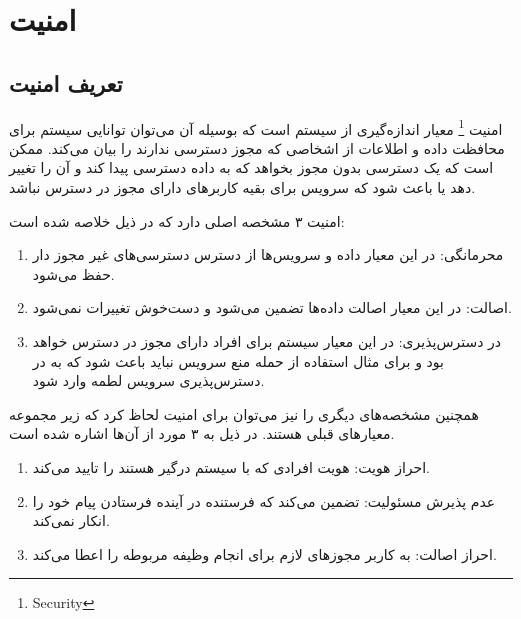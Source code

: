 \chapter{امنیت}
\section{تعریف امنیت}
امنیت \footnote{Security}
معیار اندازه‌گیری از سیستم است که بوسیله آن می‌توان توانایی سیستم برای محافظت داده و اطلاعات از اشخاصی که مجوز دسترسی ندارند را بیان می‌کند.
ممکن است که یک دسترسی بدون مجوز بخواهد که به داده دسترسی پیدا کند و آن را تغییر دهد یا باعث شود که سرویس برای بقیه کاربرهای دارای مجوز در دسترس نباشد.

امنیت ۳ مشخصه اصلی دارد که در ذیل خلاصه شده است:
\begin{enumerate}
\item
محرمانگی: در این معیار داده و سرویس‌ها از دسترس دسترسی‌های غیر مجوز دار حفظ می‌شود.
\item
اصالت: در این معیار اصالت داده‌ها تضمین می‌شود و دست‌خوش تغییرات نمی‌شود.
\item 
در دسترس‌پذیری: در این معیار سیستم برای افراد دارای مجوز در دسترس خواهد بود و برای مثال استفاده از حمله منع سرویس نباید باعث شود که به در دسترس‌پذیری سرویس لطمه وارد شود.
\end{enumerate}

همچنین مشخصه‌های دیگری را نیز می‌توان برای امنیت لحاظ کرد که زیر مجموعه‌ معیارهای قبلی هستند. 
در ذیل به ۳ مورد از آن‌ها اشاره شده است.
\begin{enumerate}
\item
احراز هویت: هویت افرادی که با سیستم درگیر هستند را تایید می‌کند.
\item
عدم پذیرش مسئولیت: 
تضمین می‌کند که فرستنده در آینده فرستادن پیام خود را انکار نمی‌کند.
\item
احراز اصالت: به کاربر مجوزهای لازم برای انجام وظیفه مربوطه را اعطا می‌کند.
\end{enumerate}

